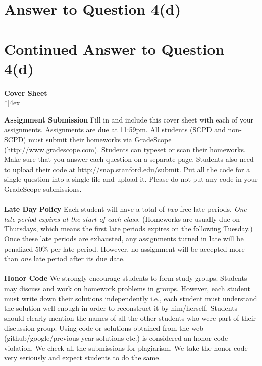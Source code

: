 \documentclass[11pt]{article}
\begin{document}
\pagebreak[4]
\section*{Answer to Question 4(d)}

\pagebreak[4]
\section*{Continued Answer to Question 4(d)}

\pagebreak[4]
\begin{center}
\LARGE{\bf \textsf{Cover Sheet}} \\*[4ex]
\end{center}

\textbf{Assignment Submission } Fill in and include this cover sheet with each of your assignments. Assignments are due at 11:59pm. All students (SCPD and non-SCPD) must submit their homeworks via GradeScope (\url{http://www.gradescope.com}). Students can typeset or scan their homeworks. Make sure that you answer each question on a separate page. Students also need to upload their code at \url{http://snap.stanford.edu/submit}. Put all the code for a single question into a single file and upload it. Please do not put any code in your GradeScope submissions.
\\
\\
\textbf{Late Day Policy } Each student will have a total of {\em two} free late periods. {\em One late period expires at the start of each class.} (Homeworks are usually due on Thursdays, which means the first late periods expires on the following Tuesday.) Once these late periods are exhausted, any assignments turned in late will be penalized 50\% per late period. However, no assignment will be accepted more than {\em one} late period after its due date.
\\
\\
\textbf{Honor Code } We strongly encourage students to form study groups. Students may discuss and work on homework problems in groups. However, each student must write down their solutions independently i.e., each student must understand the solution well enough in order to reconstruct it by him/herself.  Students should clearly mention the names of all the other students who were part of their discussion group. Using code or solutions obtained from the web (github/google/previous year solutions etc.) is considered an honor code violation. We check all the submissions for plagiarism. We take the honor code very seriously and expect students to do the same.
\end{document}
